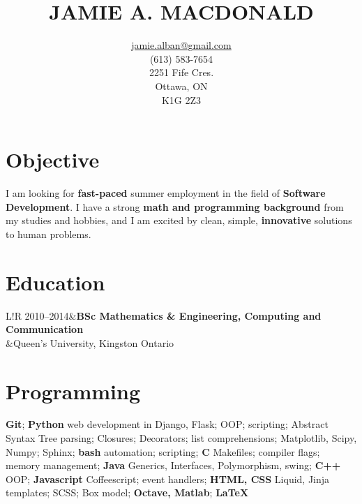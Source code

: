 \documentclass[10pt]{article}
\title{JAMIE A. MACDONALD}
\author{\href{mailto:jamie.alban@gmail.com}{jamie.alban@gmail.com}\\(613) 583-7654\\2251 Fife Cres.\\Ottawa, ON\\K1G 2Z3}
\date{}
\newcommand\VRule{\color{lightgray}\vrule width 0.5pt}
\begin{document}
\begin{minipage}{0.2\textwidth}
\hspace{0em}
\end{minipage}
\begin{minipage}{0.55\textwidth}
\vspace{-3em}
\maketitle
\end{minipage}
\begin{minipage}{0.25\textwidth}
\end{minipage}
\thispagestyle{fancy}
\vspace{-2.5em}
\section*{Objective}
I am looking for \textbf{fast-paced} summer employment in the field of \textbf{Software Development}. I have a strong \textbf{math and programming background} from my studies and hobbies, and I am excited by clean, simple, \textbf{innovative} solutions to human problems.
\section*{Education}
\begin{tabular}{L!{\VRule}R}
2010--2014&{\bf BSc Mathematics \& Engineering, Computing and Communication}\\
          &{Queen's University, Kingston Ontario}\\
\end{tabular}
\section*{Programming}
\textbf{Git}; \textbf{Python} web development in Django, Flask; OOP; scripting; Abstract Syntax Tree parsing; Closures; Decorators; list comprehensions; Matplotlib, Scipy, Numpy; Sphinx; \textbf{bash} automation; scripting; \textbf{C} Makefiles; compiler flags; memory management; \textbf{Java} Generics, Interfaces, Polymorphism, swing; \textbf{C++} OOP; \textbf{Javascript} Coffeescript; event handlers; \textbf{HTML, CSS} Liquid, Jinja templates; SCSS; Box model; \textbf{Octave, Matlab}; \textbf{LaTeX}
\end{document}
